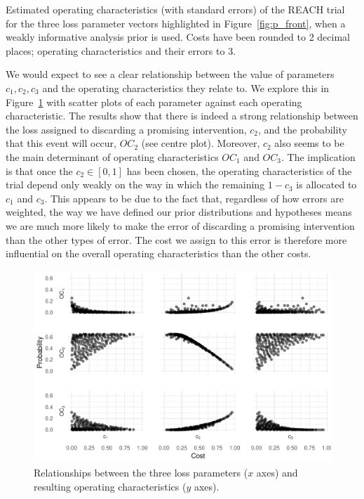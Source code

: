 \documentclass[AMA,STIX1COL]{WileyNJD-v2}
\begin{document}
\begin{table}
\centering
\caption{Estimated operating characteristics (with standard errors) of the REACH trial for the three loss parameter vectors highlighted in Figure~\ref{fig:p_front}, when a weakly informative analysis prior is used. Costs have been rounded to 2 decimal places; operating characteristics and their errors to 3.}

\label{tab:reach_points}
\end{table}

We would expect to see a clear relationship between the value of parameters $c_1, c_2, c_3$ and the operating characteristics they relate to. We explore this in Figure~\ref{fig:cost_OCs} with scatter plots of each  parameter against each operating characteristic. The results show that there is indeed a strong relationship between the loss assigned to discarding a promising intervention, $c_2$, and the probability that this event will occur, $OC_2$ (see centre plot). Moreover, $c_2$ also seems to be the main determinant of operating characteristics $OC_1$ and $OC_3$. The implication is that once the $c_2 \in [0,1]$ has been chosen, the operating characteristics of the trial depend only weakly on the way in which the remaining $1-c_3$ is allocated to $c_1$ and $c_3$. This appears to be due to the fact that, regardless of how errors are weighted, the way we have defined our prior distributions and hypotheses means we are much more likely to make the error of discarding a promising intervention than the other types of error. The cost we assign to this error is therefore more influential on the overall operating characteristics than the other costs.


\begin{figure}
\centering
\includegraphics[scale=0.8]{./figures/cost_OCs}
\caption{Relationships between the three loss parameters ($x$ axes) and resulting operating characteristics ($y$ axes).}
\label{fig:cost_OCs}
\end{figure}
\end{document}
